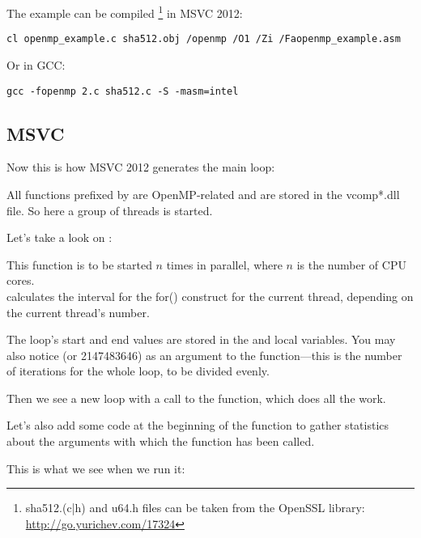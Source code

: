 The example can be compiled
\footnote{sha512.(c|h) and u64.h 
files can be taken from the OpenSSL library:
\url{http://go.yurichev.com/17324}}
in MSVC 2012:

\begin{lstlisting}
cl openmp_example.c sha512.obj /openmp /O1 /Zi /Faopenmp_example.asm
\end{lstlisting}

Or in GCC:

\begin{lstlisting}
gcc -fopenmp 2.c sha512.c -S -masm=intel
\end{lstlisting}

\subsection{MSVC}

Now this is how MSVC 2012 generates the main loop:



All functions prefixed by  
are OpenMP-related and are stored in the 
vcomp*.dll file.
So here a group of threads is started.

Let's take a look on :



This function is to be started $n$ 
times in parallel, where $n$ is the number of \ac{CPU} cores.\\
calculates the interval for the for() 
construct for the current
thread, depending on the current thread's number.

The loop's start and end values are stored in the  and  local variables.
You may also notice  (or 2147483646) 
as an argument to the 
function---this is the number of iterations for the whole loop, to be divided evenly.

Then we see a new loop with a call to the 
 function, which does all the work.

Let's also add some code at the beginning of the  function to gather statistics about
the arguments with which the function has been called.

This is what we see when we run it:

